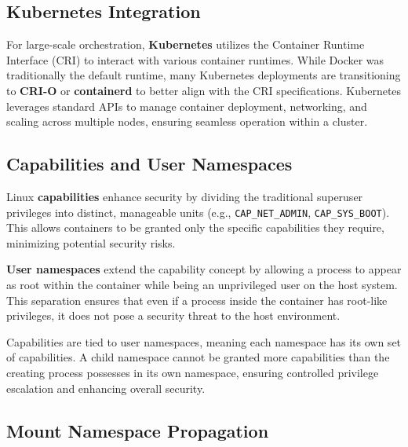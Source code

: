 \subsection{Kubernetes Integration}

For large-scale orchestration, \textbf{Kubernetes} utilizes the Container Runtime Interface (CRI) to interact with various container runtimes. While Docker was traditionally the default runtime, many Kubernetes deployments are transitioning to \textbf{CRI-O} or \textbf{containerd} to better align with the CRI specifications. Kubernetes leverages standard APIs to manage container deployment, networking, and scaling across multiple nodes, ensuring seamless operation within a cluster.

\subsection{Capabilities and User Namespaces}

Linux \textbf{capabilities} enhance security by dividing the traditional superuser privileges into distinct, manageable units (e.g., \texttt{CAP\_NET\_ADMIN}, \texttt{CAP\_SYS\_BOOT}). This allows containers to be granted only the specific capabilities they require, minimizing potential security risks.


\textbf{User namespaces} extend the capability concept by allowing a process to appear as root within the container while being an unprivileged user on the host system. This separation ensures that even if a process inside the container has root-like privileges, it does not pose a security threat to the host environment.

Capabilities are tied to user namespaces, meaning each namespace has its own set of capabilities. A child namespace cannot be granted more capabilities than the creating process possesses in its own namespace, ensuring controlled privilege escalation and enhancing overall security.

\subsection{Mount Namespace Propagation}

